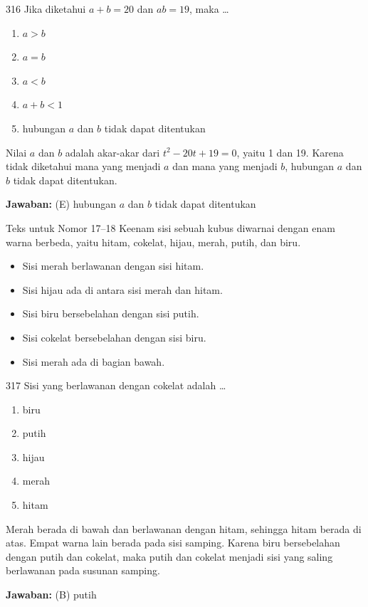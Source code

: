\documentclass[11pt]{article}
\newenvironment{pil}{\begin{enumerate}[label=(\Alph*),leftmargin=*,itemsep=1pt,topsep=3pt]}{\end{enumerate}}
\newcommand{\jw}[1]{\par\smallskip\begin{jawbox}\textbf{Jawaban:} #1\end{jawbox}}
\begin{document}
\begin{soalbox}{3}{16}
Jika diketahui $a+b=20$ dan $ab=19$, maka \ldots
\begin{pil}\item $a>b$ \item $a=b$ \item $a<b$ \item $a+b<1$ \item hubungan $a$ dan $b$ tidak dapat ditentukan\end{pil}
\end{soalbox}
\begin{pembox}
Nilai $a$ dan $b$ adalah akar-akar dari $t^2-20t+19=0$, yaitu 1 dan 19. Karena tidak diketahui mana yang menjadi $a$ dan mana yang menjadi $b$, hubungan $a$ dan $b$ tidak dapat ditentukan.
\jw{(E) hubungan $a$ dan $b$ tidak dapat ditentukan}
\end{pembox}

\begin{infobox}{Teks untuk Nomor 17--18}
Keenam sisi sebuah kubus diwarnai dengan enam warna berbeda, yaitu hitam, cokelat, hijau, merah, putih, dan biru.
\begin{itemize}[leftmargin=*,topsep=2pt,itemsep=1pt]
\item Sisi merah berlawanan dengan sisi hitam.
\item Sisi hijau ada di antara sisi merah dan hitam.
\item Sisi biru bersebelahan dengan sisi putih.
\item Sisi cokelat bersebelahan dengan sisi biru.
\item Sisi merah ada di bagian bawah.
\end{itemize}
\end{infobox}

\begin{soalbox}{3}{17}
Sisi yang berlawanan dengan cokelat adalah \ldots
\begin{pil}\item biru \item putih \item hijau \item merah \item hitam\end{pil}
\end{soalbox}
\begin{pembox}
Merah berada di bawah dan berlawanan dengan hitam, sehingga hitam berada di atas. Empat warna lain berada pada sisi samping. Karena biru bersebelahan dengan putih dan cokelat, maka putih dan cokelat menjadi sisi yang saling berlawanan pada susunan samping.
\jw{(B) putih}
\end{pembox}
\end{document}
